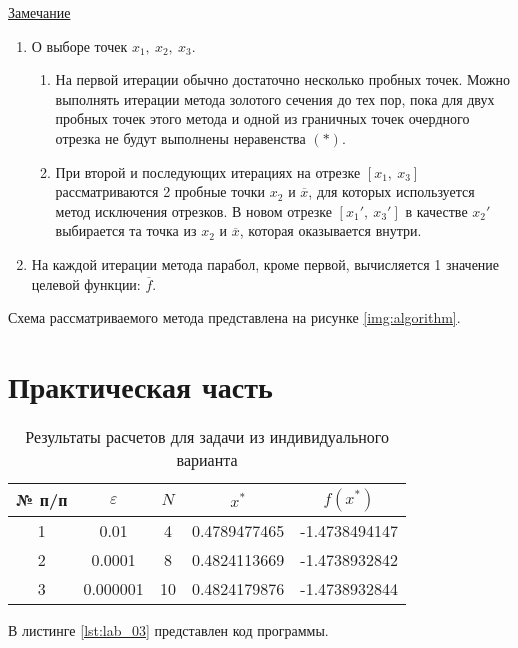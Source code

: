 \documentclass{bmstu}
\begin{document}
\underline{Замечание}
\begin{enumerate}
    \item О выборе точек $x_1, \ x_2, \ x_3$.
    \begin{enumerate}
        \item На первой итерации обычно достаточно несколько пробных точек. Можно выполнять итерации метода золотого сечения до тех пор, пока для двух пробных точек этого метода и одной из граничных точек очердного отрезка не будут выполнены неравенства $(*)$.
        \item При второй и последующих итерациях на отрезке $[x_1, \ x_3]$ рассматриваются 2 пробные точки $x_2$ и $\overline{x}$, для которых используется метод исключения отрезков. В новом отрезке $[x_1', \ x_3']$ в качестве $x_2'$ выбирается та точка из $x_2$ и $\overline{x}$, которая оказывается внутри.
    \end{enumerate}
    \item На каждой итерации метода парабол, кроме первой, вычисляется 1 значение целевой функции: $\overline{f}$.
\end{enumerate}

\clearpage

Схема рассматриваемого метода представлена на рисунке \ref{img:algorithm}. 



\chapter{Практическая часть}

\begin{table}[H]
    \centering
	\caption{Результаты расчетов для задачи из индивидуального варианта}
    \label{tbl:task}
	\begin{tabular}{|c|c|c|c|c|}
        \hline
        № п/п & $\varepsilon$ & $N$ & $x^*$ & $f(x^*)$ \\ \hline
        1 & 0.01 & 4 & 0.4789477465 & -1.4738494147 \\ \hline
        2 & 0.0001 & 8 & 0.4824113669 & -1.4738932842 \\ \hline
        3 & 0.000001 & 10 & 0.4824179876 & -1.4738932844 \\ \hline
    \end{tabular}
\end{table}

В листинге \ref{lst:lab_03} представлен код программы.

\end{document}
